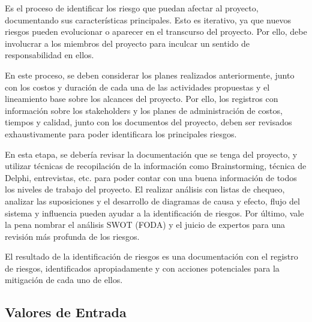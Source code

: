 Es el proceso de identificar los riesgo que puedan afectar al proyecto,
documentando sus características principales. Esto es iterativo, ya que nuevos
riesgos pueden evolucionar o aparecer en el transcurso del proyecto. Por ello,
debe involucrar a los miembros del proyecto para inculcar un sentido de
responsabilidad en ellos.

En este proceso, se deben considerar los planes realizados anteriormente,
junto con los costos y duración de cada una de las actividades propuestas y el
lineamiento base sobre los alcances del proyecto. Por ello, los registros con
información sobre los stakeholders y los planes de administración de costos,
tiempos y calidad, junto con los documentos del proyecto, deben ser revisados
exhaustivamente para poder identificara los principales riesgos.

En esta etapa, se debería revisar la documentación que se tenga del proyecto,
y utilizar técnicas de recopilación de la información como Brainstorming,
técnica de Delphi, entrevistas, etc. para poder contar con una buena
información de todos los niveles de trabajo del proyecto. El realizar análisis
con listas de chequeo, analizar las suposiciones y el desarrollo de diagramas
de causa y efecto, flujo del sistema y influencia pueden ayudar a la
identificación de riesgos. Por último, vale la pena nombrar el análisis SWOT
(FODA) y el juicio de expertos para una revisión más profunda de los riesgos.

El resultado de la identificación de riesgos es una documentación con el
registro de riesgos, identificados apropiadamente y con acciones potenciales
para la mitigación de cada uno de ellos.
\subsection{Valores de Entrada}

